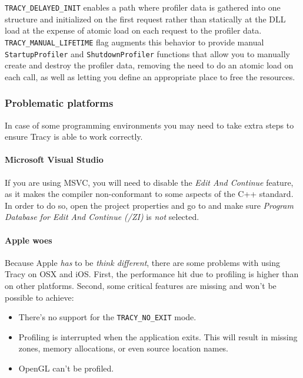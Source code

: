 \documentclass[hidelinks,titlepage,a4paper]{article}
\begin{document}
\texttt{TRACY\_DELAYED\_INIT} enables a path where profiler data is gathered into one structure and initialized on the first request rather than statically at the DLL load at the expense of atomic load on each request to the profiler data. \texttt{TRACY\_MANUAL\_LIFETIME} flag augments this behavior to provide manual \texttt{StartupProfiler} and \texttt{ShutdownProfiler} functions that allow you to manually create and destroy the profiler data, removing the need to do an atomic load on each call, as well as letting you define an appropriate place to free the resources.

\subsubsection{Problematic platforms}

In case of some programming environments you may need to take extra steps to ensure Tracy is able to work correctly.

\paragraph{Microsoft Visual Studio}

If you are using MSVC, you will need to disable the \emph{Edit And Continue} feature, as it makes the compiler non-conformant to some aspects of the C++ standard. In order to do so, open the project properties and go to  and make sure \emph{Program Database for Edit And Continue (/ZI)} is \emph{not} selected.

\paragraph{Apple woes}

Because Apple \emph{has} to be \emph{think different}, there are some problems with using Tracy on OSX and iOS. First, the performance hit due to profiling is higher than on other platforms. Second, some critical features are missing and won't be possible to achieve:

\begin{itemize}
\item There's no support for the \texttt{TRACY\_NO\_EXIT} mode.
\item Profiling is interrupted when the application exits. This will result in missing zones, memory allocations, or even source location names.
\item OpenGL can't be profiled.
\end{itemize}
\end{document}
